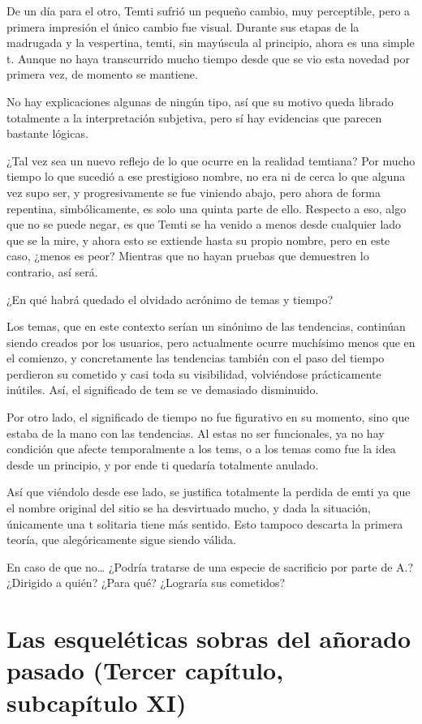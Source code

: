 \documentclass[
  spanish,
]{book}
\begin{document}
De un día para el otro, Temti sufrió un pequeño cambio, muy perceptible, pero a primera impresión el único cambio fue visual. Durante sus etapas de la madrugada y la vespertina, temti, sin mayúscula al principio, ahora es una simple t. Aunque no haya transcurrido mucho tiempo desde que se vio esta novedad por primera vez, de momento se mantiene.

No hay explicaciones algunas de ningún tipo, así que su motivo queda librado totalmente a la interpretación subjetiva, pero sí hay evidencias que parecen bastante lógicas.

¿Tal vez sea un nuevo reflejo de lo que ocurre en la realidad temtiana? Por mucho tiempo lo que sucedió a ese prestigioso nombre, no era ni de cerca lo que alguna vez supo ser, y progresivamente se fue viniendo abajo, pero ahora de forma repentina, simbólicamente, es solo una quinta parte de ello. Respecto a eso, algo que no se puede negar, es que Temti se ha venido a menos desde cualquier lado que se la mire, y ahora esto se extiende hasta su propio nombre, pero en este caso, ¿menos es peor? Mientras que no hayan pruebas que demuestren lo contrario, así será.

¿En qué habrá quedado el olvidado acrónimo de temas y tiempo?

Los temas, que en este contexto serían un sinónimo de las tendencias, continúan siendo creados por los usuarios, pero actualmente ocurre muchísimo menos que en el comienzo, y concretamente las tendencias también con el paso del tiempo perdieron su cometido y casi toda su visibilidad, volviéndose prácticamente inútiles. Así, el significado de tem se ve demasiado disminuido.

Por otro lado, el significado de tiempo no fue figurativo en su momento, sino que estaba de la mano con las tendencias. Al estas no ser funcionales, ya no hay condición que afecte temporalmente a los tems, o a los temas como fue la idea desde un principio, y por ende ti quedaría totalmente anulado.

Así que viéndolo desde ese lado, se justifica totalmente la perdida de emti ya que el nombre original del sitio se ha desvirtuado mucho, y dada la situación, únicamente una t solitaria tiene más sentido. Esto tampoco descarta la primera teoría, que alegóricamente sigue siendo válida.

En caso de que no\ldots{} ¿Podría tratarse de una especie de sacrificio por parte de A.? ¿Dirigido a quién? ¿Para qué? ¿Lograría sus cometidos?

\hypertarget{las-esqueluxe9ticas-sobras-del-auxf1orado-pasado-tercer-capuxedtulo-subcapuxedtulo-xi}{%
\section{Las esqueléticas sobras del añorado pasado (Tercer capítulo, subcapítulo XI)}\label{las-esqueluxe9ticas-sobras-del-auxf1orado-pasado-tercer-capuxedtulo-subcapuxedtulo-xi}}
\end{document}
